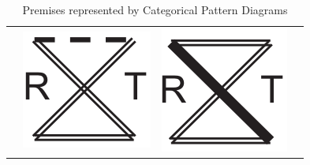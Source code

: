 \documentclass[12pt,a4paper]{report}
\begin{document}
\begin{table}[h!]
\begin{tabular}{  c  c  c  c }
\begin{minipage}{.22\textwidth}
    \end{minipage}
    & 
    \begin{minipage}{.22\textwidth}
      \includegraphics[width=\linewidth, scale=0.5]{CPDE}
    \end{minipage}
    &
    \begin{minipage}{.22\textwidth}
      \includegraphics[width=\textwidth]{CPDO}
    \end{minipage}
    \\
  \end{tabular}
  \caption{Premises represented by Categorical Pattern Diagrams}\label{tbl:cpdPremises}
\end{table}
\FloatBarrier
\end{document}
